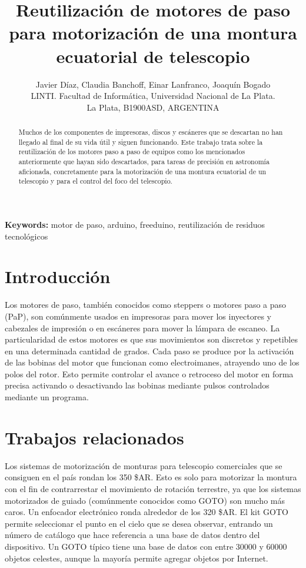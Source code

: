 \documentclass[final,narroweqnarray,inline,twoside]{ieee}
\author{Javier Díaz, Claudia Banchoff, Einar Lanfranco, Joaquín Bogado
\\LINTI. Facultad de Informática, Universidad Nacional de La Plata.
\\La Plata, B1900ASD, ARGENTINA
}
\title{Reutilización de motores de paso para motorización de una montura ecuatorial de telescopio}
\begin{document}
\maketitle
\sloppy

\begin{abstract}
Muchos de los componentes de impresoras, discos y escáneres que se descartan no han llegado al final de su vida útil y
siguen funcionando.
Este trabajo trata sobre la reutilización de los motores paso a paso de equipos como los mencionados anteriormente que hayan
sido descartados, para tareas de precisión en astronomía aficionada, concretamente para la motorización de una montura
ecuatorial de un telescopio y para el control del foco del telescopio.
\end{abstract}

\noindent \textbf{Keywords: } motor de paso, arduino, freeduino, reutilización de residuos tecnológicos

\section{Introducción}
Los motores de paso, también conocidos como steppers o motores paso a paso (PaP), son comúnmente usados en impresoras para
mover los inyectores y cabezales de impresión o en escáneres para mover la lámpara de escaneo. La particularidad de estos
motores es que sus movimientos son discretos y repetibles en una determinada cantidad de grados. Cada paso se produce por la
activación de las bobinas del motor que funcionan como electroimanes, atrayendo uno de los polos del rotor. Esto permite
controlar el avance o retroceso del motor en forma precisa activando o desactivando las bobinas mediante pulsos controlados
mediante un programa.
\section{Trabajos relacionados}
Los sistemas de motorización de monturas para telescopio comerciales que se consiguen en el país rondan los 350 \$AR. Esto
es solo para motorizar la montura con el fin de contrarrestar el movimiento de rotación terrestre, ya que los sistemas
motorizados de guiado (comúnmente conocidos como GOTO) son mucho más caros. Un enfocador electrónico ronda alrededor de los
320 \$AR. El kit GOTO permite seleccionar el punto en el cielo que se desea observar, entrando un número de catálogo que hace
referencia a una base de datos dentro del dispositivo. Un GOTO típico tiene una base de datos con entre 30000 y 60000 objetos
celestes, aunque la mayoría permite agregar objetos por Internet.
\end{document}
